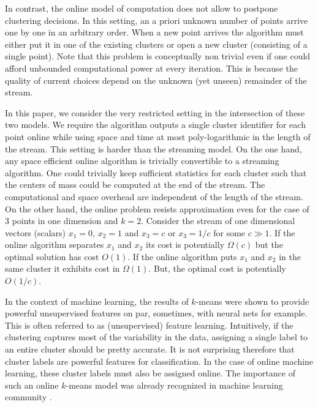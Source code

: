 \documentclass{article}
\begin{document}
In contrast, the online model of computation does not allow to postpone clustering decisions. 
In this setting, an a priori unknown number of points arrive one by one in an arbitrary order.
When a new point arrives the algorithm must either put it in one of the existing clusters or open a new cluster (consisting of a single point). 
Note that this problem is conceptually non trivial even if one could afford unbounded computational power at every iteration.
This is because the quality of current choices depend on the unknown (yet unseen) remainder of the stream.

In this paper, we consider the very restricted setting in the intersection of these two models.
We require the algorithm outputs a single cluster identifier for each point online while using space and time at most poly-logarithmic in the length of the stream.
This setting is harder than the streaming model. 
On the one hand, any space efficient online algorithm is trivially convertible to a streaming algorithm.
One could trivially keep sufficient statistics for each cluster such that the centers of mass could be computed at the end of the stream.
The computational and space overhead are independent of the length of the stream.
On the other hand, the online problem resists approximation even for the case of $3$ points in one dimension and $k=2$.
Consider the stream of one dimensional vectors (scalars) $x_1 = 0$, $x_2 = 1$ and $x_3 = c$ or $x_3 = 1/c$ for some $c \gg 1$.
If the online algorithm separates $x_1$ and $x_2$ its cost is potentially $\Omega(c)$ but the optimal solution has cost $O(1)$. 
If the online algorithm puts $x_1$ and $x_2$ in the same cluster it exhibits cost in $\Omega(1)$. But, the optimal cost is potentially $O(1/c)$. 



In the context of machine learning, the results of $k$-means were shown to provide powerful unsupervised features \cite{CoatesNL11} on par, sometimes, with neural nets for example.
This is often referred to as (unsupervised) feature learning.
Intuitively, if the clustering captures most of the variability in the data, assigning a single label to an entire cluster should be pretty accurate.
It is not surprising therefore that cluster labels are powerful features for classification. 
In the case of online machine learning, these cluster labels must also be assigned online.
The importance of such an online $k$-means model was already recognized in machine learning community \cite{ChoromanskaM12, DasguptaCSE291}.  
\end{document}
